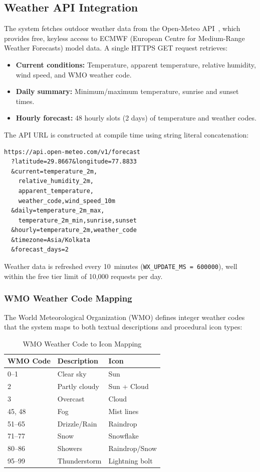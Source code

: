 \documentclass[conference]{IEEEtran}
\begin{document}
\subsection{Weather API Integration}

The system fetches outdoor weather data from the Open-Meteo API~\cite{openmeteo}, which provides free, keyless access to ECMWF (European Centre for Medium-Range Weather Forecasts) model data. A single HTTPS GET request retrieves:

\begin{itemize}
    \item \textbf{Current conditions:} Temperature, apparent temperature, relative humidity, wind speed, and WMO weather code.
    \item \textbf{Daily summary:} Minimum/maximum temperature, sunrise and sunset times.
    \item \textbf{Hourly forecast:} 48 hourly slots (2 days) of temperature and weather codes.
\end{itemize}

The API URL is constructed at compile time using string literal concatenation:
\begin{lstlisting}[caption={Open-Meteo API request URL},label={lst:apiurl}]
https://api.open-meteo.com/v1/forecast
  ?latitude=29.8667&longitude=77.8833
  &current=temperature_2m,
    relative_humidity_2m,
    apparent_temperature,
    weather_code,wind_speed_10m
  &daily=temperature_2m_max,
    temperature_2m_min,sunrise,sunset
  &hourly=temperature_2m,weather_code
  &timezone=Asia/Kolkata
  &forecast_days=2
\end{lstlisting}

Weather data is refreshed every 10~minutes (\texttt{WX\_UPDATE\_MS = 600000}), well within the free tier limit of 10,000 requests per day.

\subsubsection{WMO Weather Code Mapping}

The World Meteorological Organization (WMO) defines integer weather codes that the system maps to both textual descriptions and procedural icon types:

\begin{table}[h]
\centering
\caption{WMO Weather Code to Icon Mapping}
\label{tab:wmo_codes}
\begin{tabular}{lll}
\toprule
\textbf{WMO Code} & \textbf{Description} & \textbf{Icon} \\
\midrule
0--1 & Clear sky & Sun \\
2 & Partly cloudy & Sun + Cloud \\
3 & Overcast & Cloud \\
45, 48 & Fog & Mist lines \\
51--65 & Drizzle/Rain & Raindrop \\
71--77 & Snow & Snowflake \\
80--86 & Showers & Raindrop/Snow \\
95--99 & Thunderstorm & Lightning bolt \\
\bottomrule
\end{tabular}
\end{table}
\end{document}
